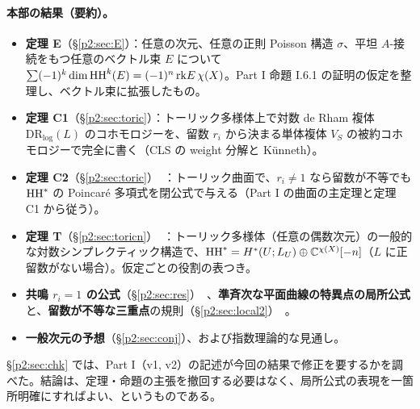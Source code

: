 \paragraph{本部の結果（要約）。}
\begin{itemize}
\item \textbf{定理 E}（\S\ref{p2:sec:E}）\tP：任意の次元、任意の正則 Poisson 構造 $\sigma$、平坦 $A$-接続をもつ任意のベクトル束 $E$ について $\sum(-1)^k\dim\mathrm{HH}^k(E)=(-1)^n\,\mathrm{rk} E\,\chi(X)$。Part I 命題 I.6.1 の証明の仮定を整理し、ベクトル束に拡張したもの。
\item \textbf{定理 C1}（\S\ref{p2:sec:toric}）\tP：トーリック多様体上で対数 de Rham 複体 $\mathrm{DR}_{\log}(L)$ のコホモロジーを、留数 $r_i$ から決まる単体複体 $V_S$ の被約コホモロジーで完全に書く（CLS の weight 分解と Künneth）。
\item \textbf{定理 C2}（\S\ref{p2:sec:toric}）\tP\ \tV：トーリック曲面で、$r_i\ne1$ なら留数が不等でも $\mathrm{HH}^*$ の Poincaré 多項式を閉公式で与える（Part I の曲面の主定理と定理 C1 から従う）。
\item \textbf{定理 T}（\S\ref{p2:sec:toricn}）\tP\ \tV：トーリック多様体（任意の偶数次元）の一般的な対数シンプレクティック構造で、$\mathrm{HH}^*=H^*(U;L_U)\oplus\mathbb C^{\chi(X)}[-n]$（$L$ に正留数がない場合）。仮定ごとの役割の表つき。
\item \textbf{共鳴 $r_i=1$ の公式}（\S\ref{p2:sec:res}）\tV\ \tK、\textbf{準斉次な平面曲線の特異点の局所公式}と、\textbf{留数が不等な三重点}の規則（\S\ref{p2:sec:local2}）\tV\ \tK。
\item \textbf{一般次元の予想}（\S\ref{p2:sec:conj}）\tK、および指数理論的な見通し。
\end{itemize}
\S\ref{p2:sec:chk} では、Part I（v1, v2）の記述が今回の結果で修正を要するかを調べた。結論は、定理・命題の主張を撤回する必要はなく、局所公式の表現を一箇所明確にすればよい、というものである。

